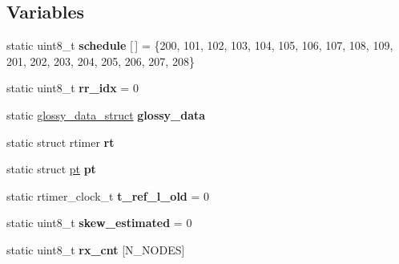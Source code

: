 \subsection*{Variables}
\begin{DoxyCompactItemize}
\item 
\hypertarget{group__glossy-test-variables_ga4a57b1e8c4269dc30db385ba72807a41}{
static uint8\_\-t {\bfseries schedule} \mbox{[}$\,$\mbox{]} = \{200, 101, 102, 103, 104, 105, 106, 107, 108, 109, 201, 202, 203, 204, 205, 206, 207, 208\}}
\label{group__glossy-test-variables_ga4a57b1e8c4269dc30db385ba72807a41}

\item 
\hypertarget{group__glossy-test-variables_gab831b564d02952f5e399ce5e204a5552}{
static uint8\_\-t {\bfseries rr\_\-idx} = 0}
\label{group__glossy-test-variables_gab831b564d02952f5e399ce5e204a5552}

\item 
\hypertarget{group__glossy-test-variables_ga6bbf497010a2f415af13dbc5c4910f02}{
static \hyperlink{structglossy__data__struct}{glossy\_\-data\_\-struct} {\bfseries glossy\_\-data}}
\label{group__glossy-test-variables_ga6bbf497010a2f415af13dbc5c4910f02}

\item 
\hypertarget{group__glossy-test-variables_ga1d5d05d50b1e23d2c49218d89872754b}{
static struct rtimer {\bfseries rt}}
\label{group__glossy-test-variables_ga1d5d05d50b1e23d2c49218d89872754b}

\item 
\hypertarget{group__glossy-test-variables_gaf04269db7f30a16bc4016d3b2ae134d5}{
static struct \hyperlink{group__glossy-test-variables_gaf04269db7f30a16bc4016d3b2ae134d5}{pt} {\bfseries pt}}
\label{group__glossy-test-variables_gaf04269db7f30a16bc4016d3b2ae134d5}

\item 
\hypertarget{group__glossy-test-variables_ga46f9e2e4e895cd040435c428e7915b22}{
static rtimer\_\-clock\_\-t {\bfseries t\_\-ref\_\-l\_\-old} = 0}
\label{group__glossy-test-variables_ga46f9e2e4e895cd040435c428e7915b22}

\item 
\hypertarget{group__glossy-test-variables_ga8f7aae7ff4364a1481312cef44f65f73}{
static uint8\_\-t {\bfseries skew\_\-estimated} = 0}
\label{group__glossy-test-variables_ga8f7aae7ff4364a1481312cef44f65f73}

\item 
\hypertarget{group__glossy-test-variables_ga30adc69ae0f6c69e08936250b866bba6}{
static uint8\_\-t {\bfseries rx\_\-cnt} \mbox{[}N\_\-NODES\mbox{]}}
\label{group__glossy-test-variables_ga30adc69ae0f6c69e08936250b866bba6}


\end{DoxyCompactItemize}
